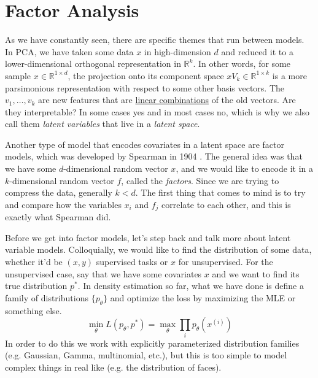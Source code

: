 \section{Factor Analysis} 

  As we have constantly seen, there are specific themes that run between models. In PCA, we have taken some data $x$ in high-dimension $d$ and reduced it to a lower-dimensional orthogonal representation in $\mathbb{R}^k$. In other words, for some sample $x \in \mathbb{R}^{1 \times d}$, the projection onto its component space $x V_k \in \mathbb{R}^{1 \times k}$ is a more parsimonious representation with respect to some other basis vectors. The $v_1, \ldots, v_k$ are new features that are \hyperref[lin-def:linear-combination]{linear combinations} of the old vectors. Are they interpretable? In some cases yes and in most cases no, which is why we also call them \textit{latent variables} that live in a \textit{latent space}. 

  Another type of model that encodes covariates in a latent space are factor models, which was developed by Spearman in 1904 \cite{1904spearman}. The general idea was that we have some $d$-dimensional random vector $x$, and we would like to encode it in a $k$-dimensional random vector $f$, called the \textit{factors}. Since we are trying to compress the data, generally $k < d$. The first thing that comes to mind is to try and compare how the variables $x_i$ and $f_j$ correlate to each other, and this is exactly what Spearman did. 

  Before we get into factor models, let's step back and talk more about latent variable models. Colloquially, we would like to find the distribution of some data, whether it'd be $(x, y)$ supervised tasks or $x$ for unsupervised. For the unsupervised case, say that we have some covariates $x$ and we want to find its true distribution $p^\ast$. In density estimation so far, what we have done is define a family of distributions $\{p_\theta\}$ and optimize the loss by maximizing the MLE or something else. 
  \begin{equation}
    \min_\theta L(p_\theta, p^\ast) = \max_\theta \prod_{i} p_\theta(x^{(i)})
  \end{equation}
  In order to do this we work with explicitly parameterized distribution families (e.g. Gaussian, Gamma, multinomial, etc.), but this is too simple to model complex things in real like (e.g. the distribution of faces).

